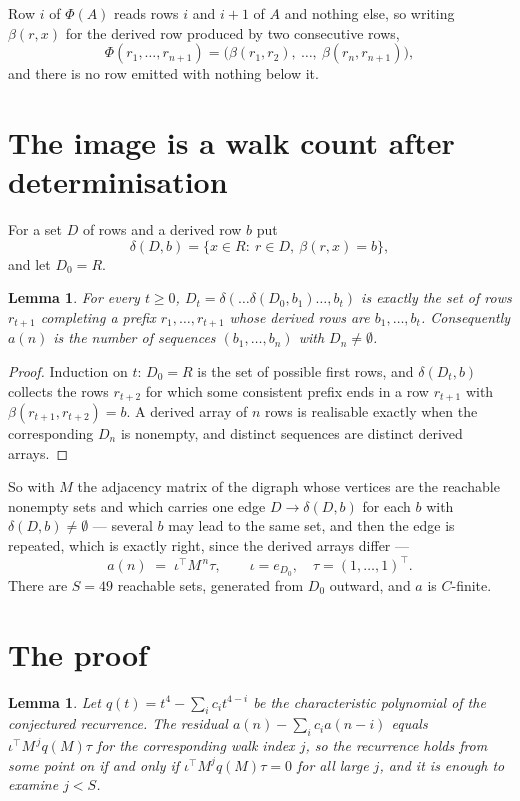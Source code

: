 \documentclass[11pt,a4paper]{article}
\theoremstyle{plain}
\newtheorem{lemma}[theorem]{Lemma}
\theoremstyle{definition}
\begin{document}
Row $i$ of $\Phi(A)$ reads rows $i$ and $i+1$ of $A$ and nothing else, so
writing $\beta(r,x)$ for the derived row produced by two consecutive rows,
\[
\Phi(r_1,\dots,r_{n+1})=\bigl(\beta(r_1,r_2),\ \dots,\ \beta(r_n,r_{n+1})\bigr),
\]
and there is no row emitted with nothing below it.

\section{The image is a walk count after determinisation}

For a set $D$ of rows and a derived row $b$ put
\[
\delta(D,b)=\{x\in R:\ r\in D,\ \beta(r,x)=b\},
\]
and let $D_0=R$.

\begin{lemma}\label{lem:det}
For every $t\ge0$, $D_t=\delta(\dots\delta(D_0,b_1)\dots,b_t)$ is exactly the set of rows
$r_{t+1}$ completing a prefix $r_1,\dots,r_{t+1}$ whose derived rows are $b_1,\dots,b_t$.
Consequently $a(n)$ is the number of sequences $(b_1,\dots,b_n)$ with $D_n\neq\emptyset$.
\end{lemma}

\begin{proof}
Induction on $t$: $D_0=R$ is the set of possible first rows, and $\delta(D_t,b)$ collects the
rows $r_{t+2}$ for which some consistent prefix ends in a row $r_{t+1}$ with
$\beta(r_{t+1},r_{t+2})=b$. A derived array of $n$ rows is realisable exactly when the
corresponding $D_n$ is nonempty, and distinct sequences are distinct derived arrays.
\end{proof}

So with $M$ the adjacency matrix of the digraph whose vertices are the reachable nonempty sets
and which carries one edge $D\to\delta(D,b)$ for each $b$ with $\delta(D,b)\neq\emptyset$ ---
several $b$ may lead to the same set, and then the edge is repeated, which is exactly right,
since the derived arrays differ ---
\[
a(n)\;=\;\iota^{\!\top}M^{\,n}\tau,\qquad \iota=e_{D_0},\quad \tau=(1,\dots,1)^{\!\top} .
\]
There are $S=49$ reachable sets, generated from $D_0$ outward, and $a$ is $C$-finite.


\section{The proof}

\begin{lemma}\label{lem:crit}
Let $q(t)=t^{4}-\sum_i c_it^{4-i}$ be the characteristic polynomial of the
conjectured recurrence. The residual $a(n)-\sum_ic_ia(n-i)$ equals
$\iota^{\!\top}M^{\,j}q(M)\tau$ for the corresponding walk index $j$, so the recurrence
holds from some point on if and only if $\iota^{\!\top}M^{j}q(M)\tau=0$ for all large $j$,
and it is enough to examine $j<S$.
\end{lemma}
\end{document}
